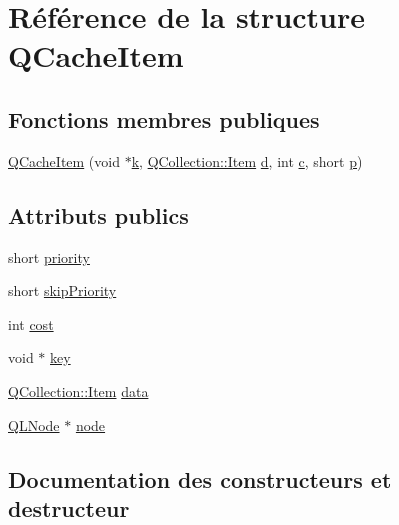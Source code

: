 \hypertarget{struct_q_cache_item}{}\section{Référence de la structure Q\+Cache\+Item}
\label{struct_q_cache_item}
\subsection*{Fonctions membres publiques}
\begin{DoxyCompactItemize}
\item 
\hyperlink{struct_q_cache_item_ad61f8abb3dcbd133ecf9cd5b2e4495d1}{Q\+Cache\+Item} (void $\ast$\hyperlink{060__command__switch_8tcl_a20363f854eb4098a446733d63d34dbc1}{k}, \hyperlink{class_q_collection_ac6f3ddbf999e31fb797927f71ae6b5d7}{Q\+Collection\+::\+Item} \hyperlink{060__command__switch_8tcl_af43f4b1f0064a33b2d662af9f06d3a00}{d}, int \hyperlink{060__command__switch_8tcl_ab14f56bc3bd7680490ece4ad7815465f}{c}, short \hyperlink{060__command__switch_8tcl_a15229b450f26d8fa1c10bea4f3279f4d}{p})
\end{DoxyCompactItemize}
\subsection*{Attributs publics}
\begin{DoxyCompactItemize}
\item 
short \hyperlink{struct_q_cache_item_a2386c848679281880c992f9177e87d93}{priority}
\item 
short \hyperlink{struct_q_cache_item_af5a4fb6189e28d3a7fe695ebf0009a44}{skip\+Priority}
\item 
int \hyperlink{struct_q_cache_item_a0c5dcfef73c448baf7d4b1c887e0c104}{cost}
\item 
void $\ast$ \hyperlink{struct_q_cache_item_a4062cd8ab1f2d787d04d0db83ceed1c8}{key}
\item 
\hyperlink{class_q_collection_ac6f3ddbf999e31fb797927f71ae6b5d7}{Q\+Collection\+::\+Item} \hyperlink{struct_q_cache_item_a0f096df61147cc33e14f70e3107b074b}{data}
\item 
\hyperlink{class_q_l_node}{Q\+L\+Node} $\ast$ \hyperlink{struct_q_cache_item_a8dbb49b621edfd42824cde3b07b97943}{node}
\end{DoxyCompactItemize}


\subsection{Documentation des constructeurs et destructeur}
\hypertarget{struct_q_cache_item_ad61f8abb3dcbd133ecf9cd5b2e4495d1}{}
